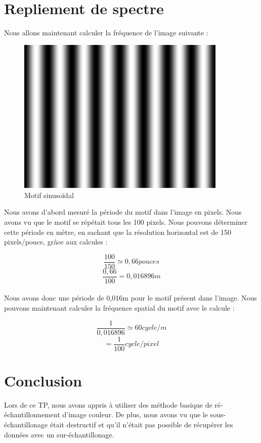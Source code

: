\documentclass[a4paper,11pt]{article}
\begin{document}
  \newpage
  
  \section{Repliement de spectre}
  Nous allons maintenant calculer la fréquence de l'image suivante :
  \begin{figure}[H]
    \center
    \includegraphics[width=10cm]{../ti-semaine-3-sinus.png}
    \caption{Motif sinusoïdal}
  \end{figure}
  
  Nous avons d'abord mesuré la période du motif dans l'image en pixels. Nous avons vu que le motif se
  répétait tous les 100 pixels. Nous pouvons déterminer cette période en mètre, en sachant que la résolution
  horizontal est de 150 pixels/pouce, grâce aux calcules : 
  
  $$\frac{100}{150} \simeq 0,66 pouces$$
  $$\frac{0,66}{100} = 0,016896 m$$
  \ \\
  
  Nous avons donc une période de 0,016m pour le motif présent dans l'image.
  Nous pouvons maintenant calculer la fréquence spatial du motif avec le calcule :
  
  $$\frac{1}{0,016896} \simeq 60 cycle/m$$
  $$ = \frac{1}{100} cycle/pixel$$
  
  \newpage
  
  \section*{Conclusion}
  Lors de ce TP, nous avons appris à utiliser des méthode basique de ré-échantillonnement d'image couleur. De plus, 
  nous avons vu que le sous-échantillonage était destructif et qu'il n'était pas possible de récupérer les données
  avec un sur-échantillonage.
 
    
\end{document}
